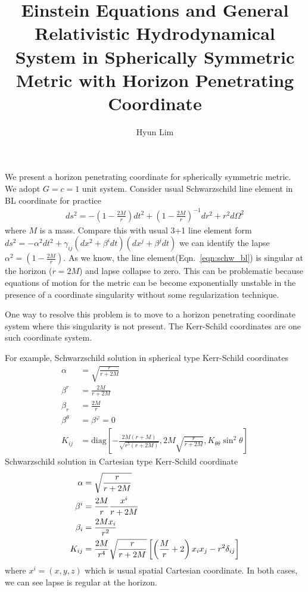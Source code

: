\documentclass[prd]{revtex4}
\begin{document}
\title{Einstein Equations and General Relativistic Hydrodynamical System in Spherically Symmetric Metric with Horizon Penetrating Coordinate}

\author{Hyun Lim}

\maketitle

We present a horizon penetrating coordinate for spherically symmetric metric. We adopt $G=c=1$ unit system. Consider usual Schwarzschild line element in BL coordinate for practice
\begin{align}
\label{eqn:schw_bl}
ds^2 = - \left(1- \frac{2M}{r} \right) dt^2 + \left(1- \frac{2M}{r} \right)^{-1} dr^2 + r^2 d\Omega^2 
\end{align}
where $M$ is a mass. Compare this with usual 3+1 line element form $ds^2 = - \alpha^2 dt^2 + \gamma_{ij} ( dx^2 + \beta^i dt)(dx^j + \beta^j dt)$ we can identify the lapse $\alpha^2 = \left(1- \frac{2M}{r} \right)$. As we know, the line element(Eqn.~\ref{eqn:schw_bl}) is singular at the horizon ($r=2M$) and lapse collapse to zero. This can be problematic because equations of motion for the metric can be become exponentially unstable in the presence of a coordinate singularity without some regularization technique.

One way to resolve this problem is to move to a horizon penetrating coordinate system where this singularity is not present. The Kerr-Schild coordinates are one such coordinate system. 

For example, Schwarzschild solution in spherical type Kerr-Schild coordinates
\begin{align}
\alpha &= \sqrt{\frac{r}{r+2M}} \\
\beta^r &= \frac{2M}{r+2M} \\
\beta_r &=\frac{2M}{r} \\
\beta^\theta &= \beta^\varphi = 0 \\
K_{ij} &= \textrm{diag} \left[ -\frac{2M(r+M)}{\sqrt{r^5 (r+2M)}} , 2M \sqrt{\frac{r}{r+2M}}, K_{\theta \theta} \sin^2 \theta \right]
\end{align}
Schwarzschild solution in Cartesian type Kerr-Schild coordinate
\begin{align}
\alpha &= \sqrt{\frac{r}{r+2M}} \\
\beta^i &= \frac{2M}{r} \frac{x^i}{r+2M} \\
\beta_i &=\frac{2M x_i}{r^2} \\
K_{ij} &= \-\frac{2M}{r^4} \sqrt{\frac{r}{r+2M}} \left[ \left( \frac{M}{r}+2 \right) x_i x_j - r^2 \delta_{ij} \right]
\end{align}
where $x^i = (x,y,z)$ which is usual spatial Cartesian coordinate. In both cases, we can see lapse is regular at the horizon.
\end{document}
